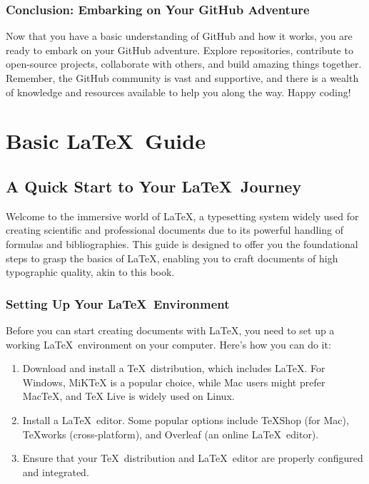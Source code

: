 \documentclass[a4paper,12pt]{book}
\begin{document}
\subsection*{Conclusion: Embarking on Your GitHub Adventure}

Now that you have a basic understanding of GitHub and how it works, you are ready to embark on your GitHub adventure. Explore repositories, contribute to open-source projects, collaborate with others, and build amazing things together. Remember, the GitHub community is vast and supportive, and there is a wealth of knowledge and resources available to help you along the way. Happy coding!

\chapter{Basic \LaTeX\ Guide}
\section*{A Quick Start to Your \LaTeX\ Journey}

Welcome to the immersive world of \LaTeX, a typesetting system widely used for creating scientific and professional documents due to its powerful handling of formulas and bibliographies. This guide is designed to offer you the foundational steps to grasp the basics of \LaTeX, enabling you to craft documents of high typographic quality, akin to this book.

\subsection*{Setting Up Your \LaTeX\ Environment}

Before you can start creating documents with \LaTeX, you need to set up a working \LaTeX\ environment on your computer. Here's how you can do it:

\begin{enumerate}
    \item Download and install a \TeX\ distribution, which includes \LaTeX. For Windows, MiKTeX is a popular choice, while Mac users might prefer MacTeX, and TeX Live is widely used on Linux.
    \item Install a \LaTeX\ editor. Some popular options include TeXShop (for Mac), TeXworks (cross-platform), and Overleaf (an online \LaTeX\ editor).
    \item Ensure that your \TeX\ distribution and \LaTeX\ editor are properly configured and integrated.
\end{enumerate}
\end{document}
